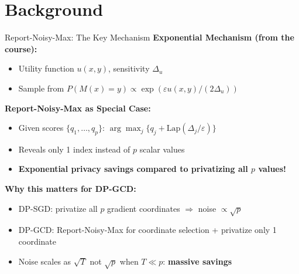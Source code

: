 \documentclass[10pt]{beamer}
\begin{document}
\section{Background}

\begin{frame}{Report-Noisy-Max: The Key Mechanism}
\textbf{Exponential Mechanism (from the course):}
\begin{itemize}
\item Utility function $u(x, y)$, sensitivity $\Delta_u$
\item Sample from $P(M(x) = y) \propto \exp(\varepsilon u(x,y)/(2\Delta_u))$
\end{itemize}

\vspace{0.8em}
\textbf{Report-Noisy-Max as Special Case:}
\begin{itemize}
\item Given scores $\{q_1, \ldots, q_p\}$: $\arg\max_j \{q_j + \text{Lap}(\Delta_j/\varepsilon)\}$
\item Reveals only \alert{1 index} instead of $p$ scalar values
\item \textbf{Exponential privacy savings compared to privatizing all $p$ values!}
\end{itemize}

\vspace{0.8em}
\textbf{Why this matters for DP-GCD:}
\begin{itemize}
\item DP-SGD: privatize all $p$ gradient coordinates $\Rightarrow$ noise $\propto \sqrt{p}$
\item DP-GCD: Report-Noisy-Max for coordinate selection + privatize only 1 coordinate
\item Noise scales as $\sqrt{T}$ not $\sqrt{p}$ when $T \ll p$: \textbf{massive savings}
\end{itemize}
\end{frame}
\end{document}
